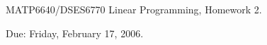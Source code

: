 \documentclass[12pt]{article}
\newcommand{\re}{I \!\! R}
\begin{document}
\begin{center}
  \begin{large}
     MATP6640/DSES6770 Linear Programming, Homework 2.
  \end{large}
\end{center}

\begin{flushright}
   Due:  Friday, February 17, 2006.
\end{flushright}


\begin{enumerate}

\end{enumerate}
\end{document}
